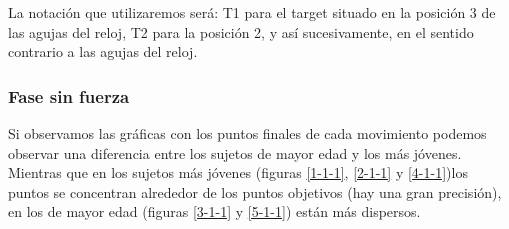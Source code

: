 \documentclass[a4paper,11pt, oneside]{book}
\begin{document}
La notación que utilizaremos será: T1 para el target situado en la posición 3 de las agujas del reloj, T2 para la posición 2, y así sucesivamente, en el sentido contrario a las agujas del reloj.

\subsubsection{Fase sin fuerza}
Si observamos las gráficas con los puntos finales de cada movimiento podemos observar una diferencia entre los sujetos de mayor edad y los más jóvenes. Mientras que en los sujetos más jóvenes (figuras \ref{1-1-1}, \ref{2-1-1} y \ref{4-1-1})los puntos se concentran alrededor de los puntos objetivos (hay una gran precisión), en los de mayor edad (figuras \ref{3-1-1} y \ref{5-1-1}) están más dispersos.
\end{document}
